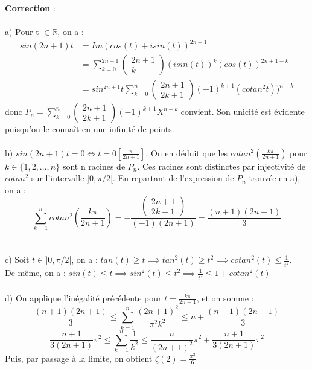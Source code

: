 \documentclass{article}
\newcommand{\R}{\mathbb{R}}   %
\begin{document}
\textbf{Correction} : \\\\
a) Pour t $\in \R$, on a :
\begin{align*}
sin(2n+1)t & =Im(cos(t)+isin(t))^{2n+1} \\
& = \sum_{k=0}^{2n+1}\begin{pmatrix} 2n+1 \\ k \end{pmatrix} (isin(t))^k(cos(t))^{2n+1-k} \\
& = sin^{2n+1}t \sum_{k=0}^{n}\begin{pmatrix} 2n+1 \\ 2k+1 \end{pmatrix} (-1)^{k+1}(cotan^2t))^{n-k}
\end{align*}
donc $P_n=\sum_{k=0}^{n}\begin{pmatrix} 2n+1 \\2k+1 \end{pmatrix} (-1)^{k+1}X^{n-k}$ convient. Son unicité est évidente puisqu'on le connaît  en une infinité de points. \\\\

b) $sin(2n+1)t=0 \iff t=0 \left [\frac{\pi}{2n+1} \right] $. On en déduit que les $cotan^2(\frac{k\pi}{2n+1})$ pour $k \in \lbrace1,2,\dots,n \rbrace$ sont n racines de $P_n$. Ces racines sont distinctes par injectivité de $cotan^2$ sur l'intervalle $]0,\pi/2[$. En repartant de l'expression de $P_n$ trouvée en a), on a : 
\begin{equation}
\sum_{k=1}^{n}cotan^2(\frac{k\pi}{2n+1})=-\frac{\begin{pmatrix} 2n+1 \\2k+1 \end{pmatrix}}{(-1)(2n+1)}=\frac{(n+1)(2n+1)}{3}
\end{equation}
\\\\

c) Soit $ t \in ]0,\pi/2[$, on a : $ tan(t) \geq t \implies tan^2(t) \geq t^2 \implies cotan^2(t) \leq \frac{1}{t^2} $. \\
De même, on a : $ sin(t) \leq t \implies sin^2(t) \leq t^2 \implies \frac{1}{t^2} \leq 1 + cotan^2(t)$ \\\\

d) On applique l'inégalité précédente pour $t=\frac{k\pi}{2n+1}$, et on somme :
\begin{equation}
\frac{(n+1)(2n+1)}{3} \leq \sum_{k=1}^{n}\frac{(2n+1)^2}{\pi^2k^2} \leq n+ \frac{(n+1)(2n+1)}{3} 
\end{equation}
\begin{equation}
\frac{n+1}{3(2n+1)}\pi^2 \leq \sum_{k=1}^{n}\frac{1}{k^2} \leq \frac{n}{(2n+1)^2}\pi^2 + \frac{n+1}{3(2n+1)}\pi^2
\end{equation}
Puis, par passage à la limite, on obtient $\zeta(2)=\frac{\pi^2}{6}$
\end{document}
